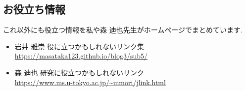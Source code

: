 \subsection{お役立ち情報}
これ以外にも役立つ情報を私や森 迪也先生がホームページでまとめています. 

\vspace{-8pt} 
\begin{itemize}[left=0pt]
  \setlength{\parskip}{0cm} %
  \setlength{\itemsep}{0cm} %
\item 岩井 雅崇 役に立つかもしれないリンク集 \\ 
\url{https://masataka123.github.io/blog3/sub5/}
\item 森 迪也 研究に役立つかもしれないリンク \\ \url{https://www.ms.u-tokyo.ac.jp/~mmori/jlink.html}
\end{itemize}


\begin{comment}
\subsection{名言集}

\begin{itemize}
\item とにかくやれ!! 【仕事の姿勢】 \url{https://www.youtube.com/watch?v=JV3KOJ_Z4Vs}
\item  丸山ゴンザレス : 精神状態を保つための秘訣 \url{https://www.youtube.com/watch?v=2jceYEcTn44}
\item  【魂の授業】パチンコをやらない君達へ向けて岡野さんが”特別授業”を開講！！【鬼越トマホーク】 \url{https://www.youtube.com/watch?v=Ug54PDqRRA0}
\end{itemize}

最後に関して, 私はパチンコを進めているわけではないです(パチンコや競馬をやったことないです). が何かどうも研究に通ずるところがあると思います. 気のせいですかね
\end{comment}


